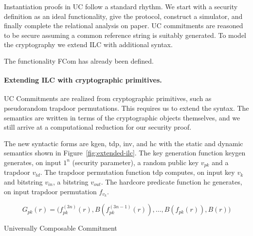 Instantiation proofs in UC follow a standard rhythm. We start with a security
definition as an ideal functionality, give the protocol, construct a simulator,
and finally complete the relational analysis on paper.  UC commitments are
reasoned to be secure assuming a common reference string is suitably generated.
To model the cryptography we extend ILC with additional syntax.

The functionality FCom has already been defined.

\paragraph{Extending ILC with cryptographic primitives.}
 UC Commitments are realized from
cryptographic primitives, such as pseudorandom trapdoor permutations. This
requires us to extend the syntax. The semantics are written in terms of the
cryptographic objects themselves, and we still arrive at a computational
reduction for our security proof.

The new syntactic forms are \textsf{kgen}, \textsf{tdp}, \textsf{inv}, and
\textsf{hc} with the static and dynamic semantics shown in
Figure~\ref{fig:extended-ilc}. The key generation function \textsf{keygen}
generates, on input $1^n$ (security parameter), a random public key $v_{pk}$ and
a trapdoor $v_{td}$. The trapdoor permutation function \textsf{tdp} computes, on
input key $v_k$ and bitstring $v_{in}$, a bitstring $v_{out}$. The hardcore
predicate function \textsf{hc} generates, on input trapdoor permutation
$f_{v_k}$.



\[ G_{pk}(r) = \big(f_{pk}^{(3n)}(r), B(f_{pk}^{(3n-1)}(r)), \ldots, B(f_{pk}(r)), B(r)\big)\]



\begin{algorithm}
\DontPrintSemicolon

\smallskip
{}
\smallskip

\caption{Universally Composable Commitment}
\label{alg:com}
\end{algorithm}

